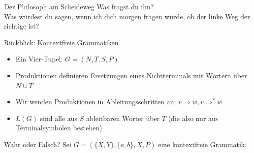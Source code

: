 \begin{frame}{Der Philosoph am Scheideweg}
	Was fragst du ihn?\\[1em] \pause
	Was würdest du sagen, wenn ich dich morgen fragen würde, ob der linke Weg der richtige ist?\\
	\bigskip
\end{frame}

\begin{frame}{Rückblick: Kontextfreie Grammatiken}
	\begin{itemize}[<+->]
		\item Ein Vier-Tupel: $G = (N, T, S, P)$
		\item Produktionen definieren Ersetzungen eines Nichtterminals mit Wörtern über $N \cup T$
		\item Wir wenden Produktionen in Ableitungsschritten an: $v \Rightarrow w, v \Rightarrow^* w$
		\item $L(G)$ sind alle aus $S$ ableitbaren Wörter über $T$ (die also nur aus Terminalsymbolen bestehen)
	\end{itemize}
\end{frame}

\begin{frame}{Wahr oder Falsch?}
	Sei $G=(\{X,Y\},\{a,b\},X,P)$ eine kontextfreie Grammatik.
	\begin{itemize}
			\end{itemize}
\end{frame}

